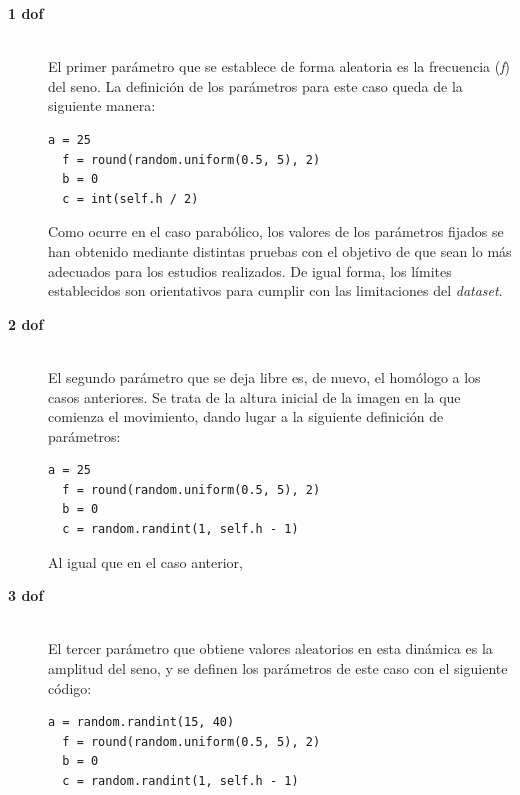 \begin{description}
\item[\textbf{1 \acrshort{dof}}] \hfill 
\vspace{10pt}
\\
El primer parámetro que se establece de forma aleatoria es la frecuencia (\textit{f}) del seno. La definición de los parámetros para este caso queda de la siguiente manera:\\
\vspace{10pt}
\begin{lstlisting}[frame=single]
  a = 25
  f = round(random.uniform(0.5, 5), 2)
  b = 0
  c = int(self.h / 2)
\end{lstlisting}

Como ocurre en el caso parabólico, los valores de los parámetros fijados se han obtenido mediante distintas pruebas con el objetivo de que sean lo más adecuados para los estudios realizados. De igual forma, los límites establecidos son orientativos para cumplir con las limitaciones del \textit{dataset}.
\vspace{10pt}
	
\item[\textbf{2 \acrshort{dof}}] \hfill
\vspace{10pt}
\\
El segundo parámetro que se deja libre es, de nuevo, el homólogo a los casos anteriores. Se trata de la altura inicial de la imagen en la que comienza el movimiento, dando lugar a la siguiente definición de parámetros:
\vspace{10pt}
\begin{lstlisting}[frame=single]
  a = 25
  f = round(random.uniform(0.5, 5), 2)
  b = 0
  c = random.randint(1, self.h - 1)
\end{lstlisting}
Al igual que en el caso anterior, 
\vspace{10pt}

\item[\textbf{3 \acrshort{dof}}] \hfill 
\vspace{10pt}
\\
El tercer parámetro que obtiene valores aleatorios en esta dinámica es la amplitud del seno, y se definen los parámetros de este caso con el siguiente código:
\vspace{10pt}
\begin{lstlisting}[frame=single]
  a = random.randint(15, 40)
  f = round(random.uniform(0.5, 5), 2)
  b = 0
  c = random.randint(1, self.h - 1)
\end{lstlisting}
\vspace{50pt}


\end{description}
